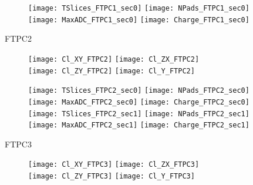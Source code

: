 \documentclass[11pt]{beamer}
\begin{document}
\begin{frame}{}
\begin{figure}
\centering
\texttt{[image: TSlices\_FTPC1\_sec0]}
\texttt{[image: NPads\_FTPC1\_sec0]}
\texttt{[image: MaxADC\_FTPC1\_sec0]}
\texttt{[image: Charge\_FTPC1\_sec0]} 
\end{figure}
\end{frame}

\begin{frame}
\centering
\Huge
FTPC2
\end{frame}

\begin{frame}{}
\begin{figure}
\centering
\texttt{[image: Cl\_XY\_FTPC2]}
\texttt{[image: Cl\_ZX\_FTPC2]}\\
\texttt{[image: Cl\_ZY\_FTPC2]}
\texttt{[image: Cl\_Y\_FTPC2]}
\end{figure}
\end{frame}

\begin{frame}{}
\begin{figure}
\centering
\texttt{[image: TSlices\_FTPC2\_sec0]}
\texttt{[image: NPads\_FTPC2\_sec0]}
\texttt{[image: MaxADC\_FTPC2\_sec0]}
\texttt{[image: Charge\_FTPC2\_sec0]} \\
\texttt{[image: TSlices\_FTPC2\_sec1]}
\texttt{[image: NPads\_FTPC2\_sec1]}
\texttt{[image: MaxADC\_FTPC2\_sec1]}
\texttt{[image: Charge\_FTPC2\_sec1]}
\end{figure}
\end{frame}

\begin{frame}
\centering
\Huge
FTPC3
\end{frame}

\begin{frame}{}
\begin{figure}
\centering
\texttt{[image: Cl\_XY\_FTPC3]}
\texttt{[image: Cl\_ZX\_FTPC3]}\\
\texttt{[image: Cl\_ZY\_FTPC3]}
\texttt{[image: Cl\_Y\_FTPC3]}
\end{figure}
\end{frame}
\end{document}
